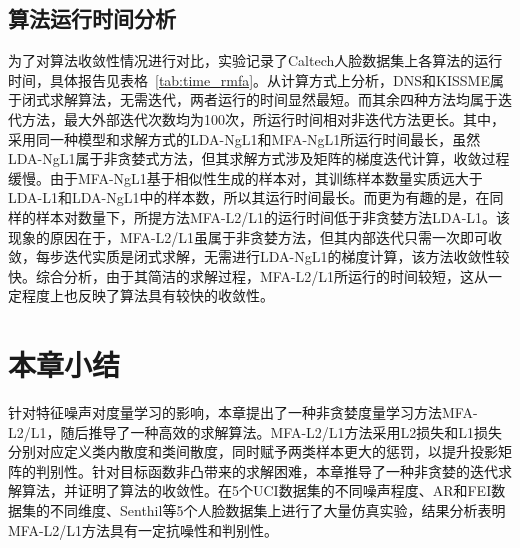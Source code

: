 \subsection{算法运行时间分析} 
为了对算法收敛性情况进行对比，实验记录了Caltech人脸数据集上各算法的运行时间，具体报告见表格~\ref{tab:time_rmfa}。从计算方式上分析，DNS和KISSME属于闭式求解算法，无需迭代，两者运行的时间显然最短。而其余四种方法均属于迭代方法，最大外部迭代次数均为100次，所运行时间相对非迭代方法更长。其中，采用同一种模型和求解方式的LDA-NgL1和MFA-NgL1所运行时间最长，虽然LDA-NgL1属于非贪婪式方法，但其求解方式涉及矩阵的梯度迭代计算，收敛过程缓慢。由于MFA-NgL1基于相似性生成的样本对，其训练样本数量实质远大于LDA-L1和LDA-NgL1中的样本数，所以其运行时间最长。而更为有趣的是，在同样的样本对数量下，所提方法MFA-L2/L1的运行时间低于非贪婪方法LDA-L1。该现象的原因在于，MFA-L2/L1虽属于非贪婪方法，但其内部迭代只需一次即可收敛，每步迭代实质是闭式求解，无需进行LDA-NgL1的梯度计算，该方法收敛性较快。综合分析，由于其简洁的求解过程，MFA-L2/L1所运行的时间较短，这从一定程度上也反映了算法具有较快的收敛性。
\begin{table}[!htbp]
{\renewcommand\baselinestretch{0.86}\selectfont
\renewcommand{\arraystretch}{1.3}
    \caption{各方法在Caltech数据集上的运行时间对比}
    \label{tab:time_rmfa}
\centering
{}
\par}
\end{table}

\section{本章小结}
针对特征噪声对度量学习的影响，本章提出了一种非贪婪度量学习方法MFA-L2/L1，随后推导了一种高效的求解算法。MFA-L2/L1方法采用L2损失和L1损失分别对应定义类内散度和类间散度，同时赋予两类样本更大的惩罚，以提升投影矩阵的判别性。针对目标函数非凸带来的求解困难，本章推导了一种非贪婪的迭代求解算法，并证明了算法的收敛性。在5个UCI数据集的不同噪声程度、AR和FEI数据集的不同维度、Senthil等5个人脸数据集上进行了大量仿真实验，结果分析表明MFA-L2/L1方法具有一定抗噪性和判别性。
